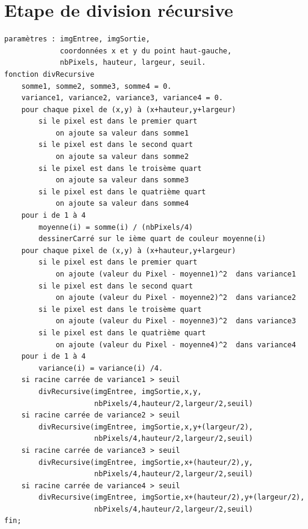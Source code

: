 \documentclass[a4paper,11pt]{article}
\begin{document}
\section{Etape de division récursive}
\begin{verbatim}
paramètres : imgEntree, imgSortie,
             coordonnées x et y du point haut-gauche,
             nbPixels, hauteur, largeur, seuil.
fonction divRecursive
    somme1, somme2, somme3, somme4 = 0.
    variance1, variance2, variance3, variance4 = 0.
    pour chaque pixel de (x,y) à (x+hauteur,y+largeur)
        si le pixel est dans le premier quart
            on ajoute sa valeur dans somme1
        si le pixel est dans le second quart
            on ajoute sa valeur dans somme2
        si le pixel est dans le troisème quart
            on ajoute sa valeur dans somme3
        si le pixel est dans le quatrième quart
            on ajoute sa valeur dans somme4
    pour i de 1 à 4
        moyenne(i) = somme(i) / (nbPixels/4)
        dessinerCarré sur le ième quart de couleur moyenne(i)
    pour chaque pixel de (x,y) à (x+hauteur,y+largeur)
        si le pixel est dans le premier quart
            on ajoute (valeur du Pixel - moyenne1)^2  dans variance1
        si le pixel est dans le second quart
            on ajoute (valeur du Pixel - moyenne2)^2  dans variance2
        si le pixel est dans le troisème quart
            on ajoute (valeur du Pixel - moyenne3)^2  dans variance3
        si le pixel est dans le quatrième quart
            on ajoute (valeur du Pixel - moyenne4)^2  dans variance4
    pour i de 1 à 4
        variance(i) = variance(i) /4.
    si racine carrée de variance1 > seuil
        divRecursive(imgEntree, imgSortie,x,y,
                     nbPixels/4,hauteur/2,largeur/2,seuil)
    si racine carrée de variance2 > seuil
        divRecursive(imgEntree, imgSortie,x,y+(largeur/2),
                     nbPixels/4,hauteur/2,largeur/2,seuil)
    si racine carrée de variance3 > seuil
        divRecursive(imgEntree, imgSortie,x+(hauteur/2),y,
                     nbPixels/4,hauteur/2,largeur/2,seuil)
    si racine carrée de variance4 > seuil
        divRecursive(imgEntree, imgSortie,x+(hauteur/2),y+(largeur/2),
                     nbPixels/4,hauteur/2,largeur/2,seuil)
fin;
\end{verbatim}
\end{document}

